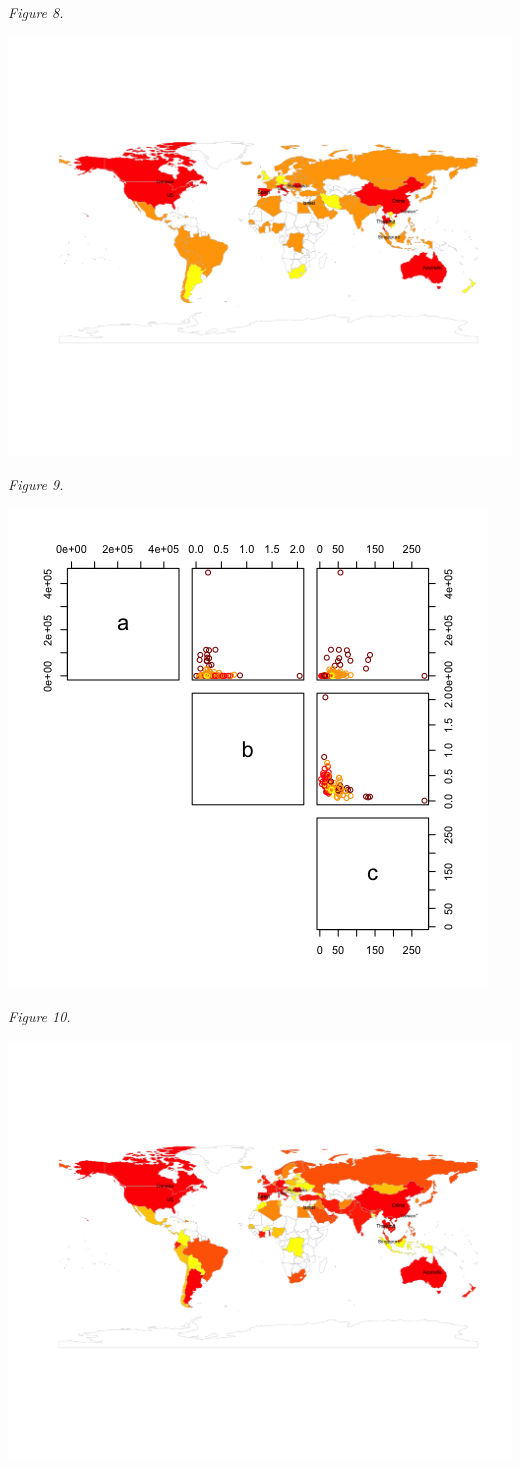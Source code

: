 \documentclass[]{article}
\begin{document}
\emph{Figure 8.}

\begin{center}\includegraphics[width=0.9\linewidth]{./gkmeans_map} \end{center}

\emph{Figure 9.}

\begin{center}\includegraphics[width=0.9\linewidth]{./gmm_plot} \end{center}

\emph{Figure 10.}

\begin{center}\includegraphics[width=0.9\linewidth]{./gmm_map} \end{center}
\end{document}
